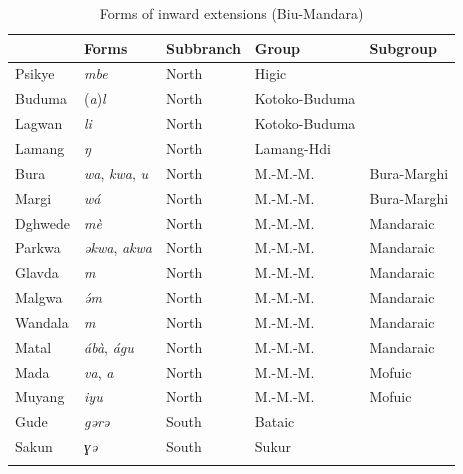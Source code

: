 \begin{table}[b]
	\caption{Forms of inward extensions (Biu-Mandara)}
	\label{tab:intolang}
	\begin{tabular}{lllll}
		\lsptoprule
		&     Forms    &  Subbranch & Group & Subgroup        \\
		\midrule
		Psikye	&	\textit{mbe}	&	North	&	Higic	&	\\
		Buduma	&	(\textit{a})\textit{l}	&	North	&	Kotoko-Buduma	&	\\
		Lagwan	&	\textit{li}	&	North	&	Kotoko-Buduma	& \\
		Lamang	&	\textit{ŋ}	&	North	&	Lamang-Hdi	& \\
		Bura	&	\textit{wa}, \textit{kwa}, \textit{u}	&	North	&	M.-M.-M.	& Bura-Marghi \\
		Margi	&	\textit{wá}	&	North	&	M.-M.-M.	& Bura-Marghi \\
		Dghwede	&	\textit{mè}	&	North	&	M.-M.-M.	& Mandaraic \\
		Parkwa	&	\textit{əkwa}, \textit{akwa}	&	North	&	M.-M.-M.	& Mandaraic \\
		Glavda	&	\textit{m}	&	North	&	M.-M.-M.	& Mandaraic \\
		Malgwa	&	\textit{ə́m}	&	North	&	M.-M.-M.	& Mandaraic \\
		Wandala	&	\textit{m}	&	North	&	M.-M.-M.	& Mandaraic \\
		Matal	&	\textit{ábà}, \textit{águ}	&	North	&	M.-M.-M.	& Mandaraic \\
		Mada	&	\textit{va}, \textit{a}	&	North	&	M.-M.-M.	& Mofuic \\
		Muyang 	&	\textit{iyu}	&	North	&	M.-M.-M.	& Mofuic \\
		Gude	&	\textit{gərə}	&	South	&	Bataic	& \\ 
		Sakun	&	\textit{ɣə}	&	South	&	Sukur	& \\
		\lspbottomrule
	\end{tabular}
\end{table}

